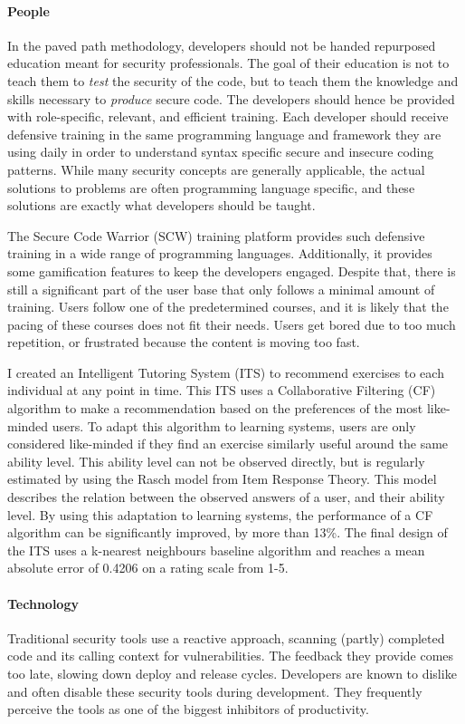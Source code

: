 \paragraph{People}
In the paved path methodology, developers should not be handed repurposed education meant for security professionals.
The goal of their education is not to teach them to \textit{test} the security of the code, but to teach them the knowledge and skills necessary to \textit{produce} secure code.
The developers should hence be provided with role-specific, relevant, and efficient training.
Each developer should receive defensive training in the same programming language and framework they are using daily in order to understand syntax specific secure and insecure coding patterns.
While many security concepts are generally applicable, the actual solutions to problems are often programming language specific, and these solutions are exactly what developers should be taught.

The Secure Code Warrior (SCW) training platform provides such defensive training in a wide range of programming languages.
Additionally, it provides some gamification features to keep the developers engaged.
Despite that, there is still a significant part of the user base that only follows a minimal amount of training.
Users follow one of the predetermined courses, and it is likely that the pacing of these courses does not fit their needs.
Users get bored due to too much repetition, or frustrated because the content is moving too fast.

I created an Intelligent Tutoring System (ITS) to recommend exercises to each individual at any point in time.
This ITS uses a Collaborative Filtering (CF) algorithm to make a recommendation based on the preferences of the most like-minded users.
To adapt this algorithm to learning systems, users are only considered like-minded if they find an exercise similarly useful around the same ability level.
This ability level can not be observed directly, but is regularly estimated by using the Rasch model from Item Response Theory.
This model describes the relation between the observed answers of a user, and their ability level.
By using this adaptation to learning systems, the performance of a CF algorithm can be significantly improved, by more than 13\%.
The final design of the ITS uses a k-nearest neighbours baseline algorithm and reaches a mean absolute error of 0.4206 on a rating scale from 1-5.

\paragraph{Technology}
Traditional security tools use a reactive approach, scanning (partly) completed code and its calling context for vulnerabilities.
The feedback they provide comes too late, slowing down deploy and release cycles.
Developers are known to dislike and often disable these security tools during development.
They frequently perceive the tools as one of the biggest inhibitors of productivity.

